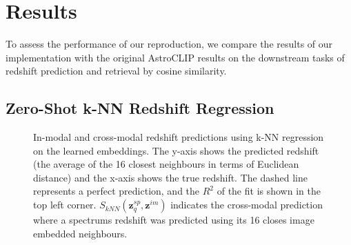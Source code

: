 
\section{Results}\label{sec:results}
To assess the performance of our reproduction, we compare the results of our implementation with the original AstroCLIP
results on the downstream tasks of redshift prediction and retrieval by cosine similarity.

\subsection{Zero-Shot k-NN Redshift Regression}\label{subsec:results-redshift-regression}
\begin{figure}[htb]
    \centering
    \caption{In-modal and cross-modal redshift predictions using k-NN regression on the learned embeddings. The y-axis shows
    the predicted redshift (the average of the 16 closest neighbours in terms of Euclidean distance) and the x-axis shows the true redshift.
    The dashed line represents a perfect prediction, and the $R^{2}$ of the fit is shown in the top left corner.
    $S_{kNN}(\mathbf{z}_{q}^{sp}, \mathbf{z}^{im})$ indicates the cross-modal prediction where a spectrums redshift was
    predicted using its 16 closes image embedded neighbours.}
    \label{fig:rkr}
\end{figure}
